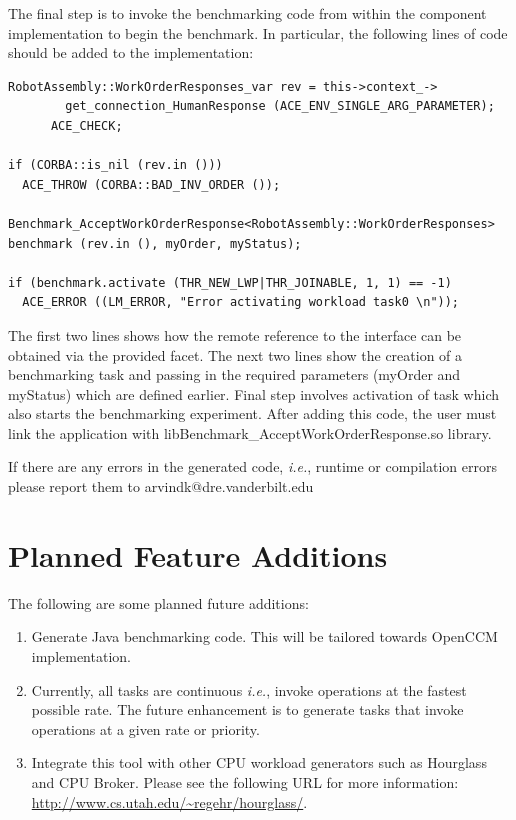 \documentclass[onecolumn]{article}
\begin{document}
The final step is to invoke the benchmarking code from within the
component implementation to begin the benchmark. In particular, the
following lines of code should be added to the implementation:

{
\footnotesize

\begin{verbatim}
RobotAssembly::WorkOrderResponses_var rev = this->context_->
        get_connection_HumanResponse (ACE_ENV_SINGLE_ARG_PARAMETER);
      ACE_CHECK;

if (CORBA::is_nil (rev.in ()))
  ACE_THROW (CORBA::BAD_INV_ORDER ());

Benchmark_AcceptWorkOrderResponse<RobotAssembly::WorkOrderResponses>
benchmark (rev.in (), myOrder, myStatus);

if (benchmark.activate (THR_NEW_LWP|THR_JOINABLE, 1, 1) == -1)
  ACE_ERROR ((LM_ERROR, "Error activating workload task0 \n"));

\end{verbatim}
}

The first two lines shows how the remote reference to the interface
can be obtained via the provided facet. The next two lines show the
creation of a benchmarking task and passing in the required parameters
(myOrder and myStatus) which are defined earlier. Final step involves
activation of task which also starts the benchmarking experiment.
After adding this code, the user must link the application with
libBenchmark\_AcceptWorkOrderResponse.so library.

If there are any errors in the generated code, {\em i.e.}, runtime or
compilation errors please report them to arvindk@dre.vanderbilt.edu

\section* {Planned Feature Additions}
The following are some planned future additions:
\begin{enumerate}

\item Generate Java benchmarking code. This will be tailored towards
OpenCCM implementation.

\item Currently, all tasks are continuous {\em i.e.}, invoke operations at
the fastest possible rate. The future enhancement is to generate tasks
that invoke operations at a given rate or priority.

\item Integrate this tool with other CPU workload generators such as
Hourglass and CPU Broker. Please see the following URL for more
information: \url{http://www.cs.utah.edu/~regehr/hourglass/}.
\end{enumerate}
\end{document}
